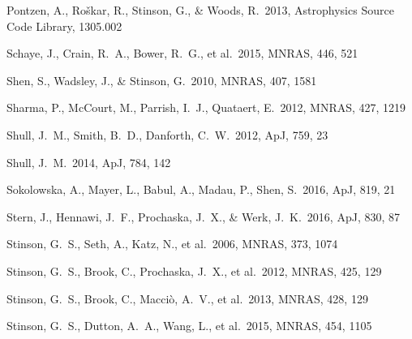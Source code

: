 \documentclass[useAMS,usenatbib]{mn2e}
\def \apj {ApJ}
\def \mnras {MNRAS}
\begin{document}
\begin{thebibliography}{}
 Pontzen, A., Ro{\v s}kar, R., Stinson, G., \& Woods, R.\ 2013, Astrophysics Source Code Library, 1305.002 





 Schaye, J., Crain,
  R.~A., Bower, R.~G., et al.\ 2015, \mnras, 446, 521

  
 Shen, S., Wadsley, J., 
\& Stinson, G.\ 2010, \mnras, 407, 1581 

Sharma, P., McCourt, M., Parrish, I.~J., Quataert, E.\ 2012, \mnras, 427, 1219

Shull, J.~M., Smith, B.~D., Danforth, C.~W.\ 2012, \apj, 759, 23

%
 Shull, J.~M.\ 2014, \apj, 784, 142

Sokolowska, A., Mayer, L., Babul, A., Madau, P., Shen, S.\ 2016, \apj, 819, 21

 Stern, J., Hennawi, J.~F., Prochaska, J.~X., \& Werk, J.~K.\ 2016, \apj, 830, 87 


 Stinson, G.~S., Seth, A., Katz, N., et al.\ 2006, \mnras, 373, 1074

%
 Stinson, G.~S., Brook, C., Prochaska, J.~X., et al.\ 2012, \mnras, 425, 129

 Stinson, G.~S., Brook, 
C., Macci{\`o}, A.~V., et al.\ 2013, \mnras, 428, 129 

 Stinson, G.~S., Dutton, A.~A., Wang, L., et al.\ 2015, \mnras, 454, 1105 


\end{thebibliography}
\end{document}
